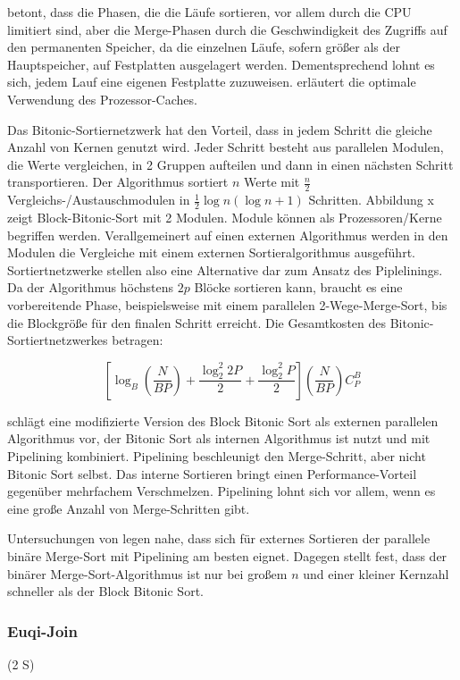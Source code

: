 \documentclass[a4paper,12pt,twoside]{article}
\begin{document}
{\textcite{Salzberg1990}} betont, dass die Phasen, die die Läufe sortieren, vor allem durch die CPU limitiert sind, aber die Merge-Phasen durch die Geschwindigkeit des Zugriffs auf den permanenten Speicher, da die einzelnen Läufe, sofern größer als der Hauptspeicher, auf Festplatten ausgelagert werden. Dementsprechend lohnt es sich, jedem Lauf eine eigenen Festplatte zuzuweisen. {\textcite{Hao2009}} erläutert die optimale Verwendung des Prozessor-Caches.

Das Bitonic-Sortiernetzwerk {\autocite[S. 335f]{Bitton1983}} hat den Vorteil, dass in jedem Schritt die gleiche Anzahl von Kernen genutzt wird. Jeder Schritt besteht aus parallelen Modulen, die Werte vergleichen, in 2 Gruppen aufteilen und dann in einen nächsten Schritt transportieren. Der Algorithmus sortiert $n$ Werte mit $\frac {n} {2} $ Vergleichs-/Austauschmodulen in $\frac{1}{2} \log n (\log n +1)$ Schritten. Abbildung x zeigt Block-Bitonic-Sort mit 2 Modulen. Module können als Prozessoren/Kerne begriffen werden. Verallgemeinert auf einen externen Algorithmus werden in den Modulen die Vergleiche mit einem externen Sortieralgorithmus ausgeführt. Sortiertnetzwerke stellen also eine Alternative dar zum Ansatz des Piplelinings. Da der Algorithmus höchstens $2p$ Blöcke sortieren kann, braucht es eine vorbereitende Phase, beispielsweise mit einem parallelen 2-Wege-Merge-Sort, bis die Blockgröße für den finalen Schritt erreicht. Die Gesamtkosten des Bitonic-Sortiertnetzwerkes betragen:

\[ \left[ \log _B (\frac {N} {B P}) + \frac {\log _2 ^2 2 P} {2} + \frac {\log _2 ^2 P} {2} \right] ( \frac {N}{B P}) C _{P} ^{B} \]

{\textcite{Menon1986}} schlägt eine modifizierte Version des Block Bitonic Sort als externen parallelen Algorithmus vor, der Bitonic Sort als internen Algorithmus ist nutzt und mit Pipelining kombiniert. Pipelining beschleunigt den Merge-Schritt, aber nicht Bitonic Sort selbst. Das interne Sortieren bringt einen Performance-Vorteil gegenüber mehrfachem Verschmelzen. Pipelining lohnt sich vor allem, wenn es eine große Anzahl von Merge-Schritten gibt.

Untersuchungen von {\textcite{Bitton1984}} legen nahe, dass sich für externes Sortieren der parallele binäre Merge-Sort mit Pipelining am besten eignet. Dagegen stellt {\textcite{Menon1986}} fest, dass der binärer Merge-Sort-Algorithmus ist nur bei großem $n$ und einer kleiner Kernzahl schneller als der Block Bitonic Sort.

\subsubsection{Euqi-Join} (2 S)
\end{document}
